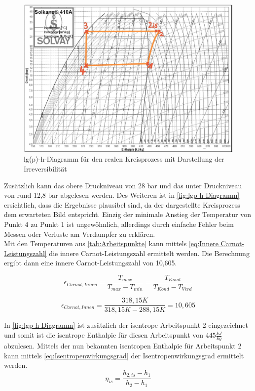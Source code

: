     \begin{figure}[!h]
        \centering
        \includegraphics[width=\textwidth]{Abbildungen/lgp-h-diagramm.jpg}
        \caption{lg(p)-h-Diagramm für den realen Kreisprozess mit Darstellung der Irreversibilität}
        \label{fig:lgp-h-Diagramm}
    \end{figure}


    Zusätzlich kann das obere Druckniveau von 28 bar und das unter Druckniveau von rund 12,8 bar abgelesen werden.
    Des Weiteren ist in \autoref{fig:lgp-h-Diagramm} ersichtlich, dass die Ergebnisse plausibel sind, da der dargestellte Kreisprozess dem erwarteten Bild entspricht. Einzig der minimale Anstieg der Temperatur von Punkt 4 zu Punkt 1 ist ungewöhnlich, allerdings durch einfache Fehler beim Messen oder Verluste am Verdampfer zu erklären.\\

Mit den Temperaturen aus \autoref{tab:Arbeitspunkte} kann mittels \autoref{eq:Innere Carnot-Leistungszahl} die innere Carnot-Leistungszahl
ermittelt werden. Die Berechnung ergibt dann eine innere Carnot-Leistungszahl von 10,605.

    \begin{equation}
        \epsilon_{Carnot, Innen}=\frac{T_{max}}{T_{max}-T_{min}}=\frac{T_{Kond}}{T_{Kond}-T_{Verd}}
        \label{eq:Innere Carnot-Leistungszahl}
    \end{equation}

$$\epsilon_{Carnot, Innen}=\frac{318,15 K}{318,15 K-288,15 K}=10,605$$

 In \autoref{fig:lgp-h-Diagramm} ist zusätzlich der isentrope Arbeitspunkt 2 eingezeichnet und somit ist die isentrope Enthalpie für diesen Arbeitspunkt von $445 \frac{kJ}{kg}$abzulesen.
Mittels der nun bekannten isentropen Enthalpie für Arbeitspunkt 2 kann mittels \autoref{eq:Isentropenwirkungsgrad} der Isentropenwirkungsgrad ermittelt werden.
\begin{equation}
    \eta_{is}=\frac{h_{2,is}-h_{1}}{h_{2}-h_{1}}
    \label{eq:Isentropenwirkungsgrad}
\end{equation}

